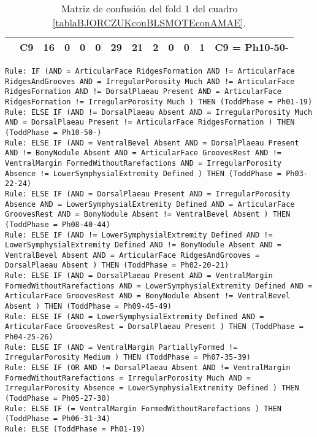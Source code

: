 \begin{table}[H]
{\begin{tabular}{|ccrrrrrrrrrrc|}
\multicolumn{1}{|c|}{}                                      & \multicolumn{1}{c|}{C9} & \multicolumn{1}{c|}{\textbf{16}} & \multicolumn{1}{c|}{0}  & \multicolumn{1}{c|}{0}  & \multicolumn{1}{c|}{0}  & \multicolumn{1}{c|}{\textbf{29}} & \multicolumn{1}{c|}{\textbf{21}} & \multicolumn{1}{c|}{\textbf{2}}  & \multicolumn{1}{c|}{0}  & \multicolumn{1}{c|}{0}  & \multicolumn{1}{c|}{\textbf{1}}  & C9 = Ph10-50-     \\ \hline
\end{tabular}%
}
\caption{Matriz de confusión del fold 1 del cuadro \ref{tablaBJORCZUKconBLSMOTEconAMAE}.}
\end{table}


\begin{lstlisting}
Rule: IF (AND = ArticularFace RidgesFormation AND != ArticularFace RidgesAndGrooves AND = IrregularPorosity Much AND != ArticularFace RidgesFormation AND != DorsalPlaeau Present AND = ArticularFace RidgesFormation != IrregularPorosity Much ) THEN (ToddPhase = Ph01-19)
Rule: ELSE IF (AND != DorsalPlaeau Absent AND = IrregularPorosity Much AND = DorsalPlaeau Present != ArticularFace RidgesFormation ) THEN (ToddPhase = Ph10-50-)
Rule: ELSE IF (AND = VentralBevel Absent AND = DorsalPlaeau Present AND != BonyNodule Absent AND = ArticularFace GroovesRest AND != VentralMargin FormedWithoutRarefactions AND = IrregularPorosity Absence != LowerSymphysialExtremity Defined ) THEN (ToddPhase = Ph03-22-24)
Rule: ELSE IF (AND = DorsalPlaeau Present AND = IrregularPorosity Absence AND = LowerSymphysialExtremity Defined AND = ArticularFace GroovesRest AND = BonyNodule Absent != VentralBevel Absent ) THEN (ToddPhase = Ph08-40-44)
Rule: ELSE IF (AND != LowerSymphysialExtremity Defined AND != LowerSymphysialExtremity Defined AND != BonyNodule Absent AND = VentralBevel Absent AND = ArticularFace RidgesAndGrooves = DorsalPlaeau Absent ) THEN (ToddPhase = Ph02-20-21)
Rule: ELSE IF (AND = DorsalPlaeau Present AND = VentralMargin FormedWithoutRarefactions AND = LowerSymphysialExtremity Defined AND = ArticularFace GroovesRest AND = BonyNodule Absent != VentralBevel Absent ) THEN (ToddPhase = Ph09-45-49)
Rule: ELSE IF (AND = LowerSymphysialExtremity Defined AND = ArticularFace GroovesRest = DorsalPlaeau Present ) THEN (ToddPhase = Ph04-25-26)
Rule: ELSE IF (AND = VentralMargin PartiallyFormed != IrregularPorosity Medium ) THEN (ToddPhase = Ph07-35-39)
Rule: ELSE IF (OR AND != DorsalPlaeau Absent AND != VentralMargin FormedWithoutRarefactions = IrregularPorosity Much AND = IrregularPorosity Absence = LowerSymphysialExtremity Defined ) THEN (ToddPhase = Ph05-27-30)
Rule: ELSE IF (= VentralMargin FormedWithoutRarefactions ) THEN (ToddPhase = Ph06-31-34)
Rule: ELSE (ToddPhase = Ph01-19)
\end{lstlisting}


